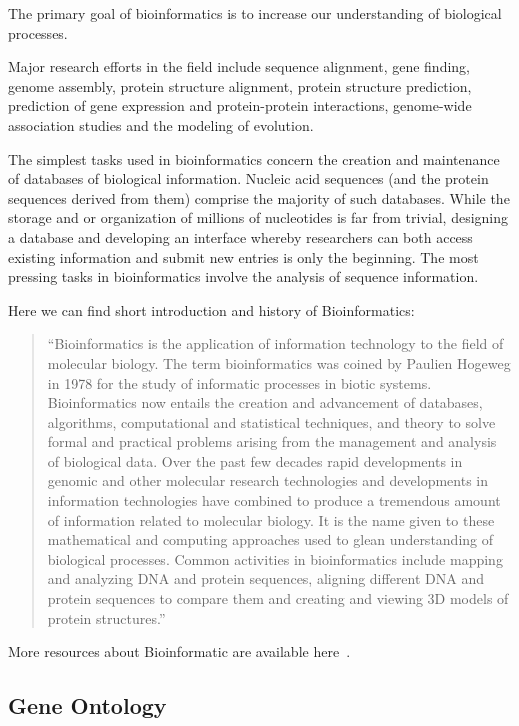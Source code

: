 The primary goal of bioinformatics is to increase our understanding of biological processes.


Major research efforts in the field include sequence alignment, gene finding, genome assembly, protein structure alignment, protein structure prediction, prediction of gene expression and protein-protein interactions, genome-wide association studies and the modeling of evolution.


The simplest tasks used in bioinformatics concern the creation and maintenance of databases of biological information.
Nucleic acid sequences (and the protein sequences derived from them) comprise the majority of such databases. While the storage and or organization of millions of nucleotides is far from trivial,
designing a database and developing an interface whereby researchers can both access existing information and submit new entries is only the beginning.
The most pressing tasks in bioinformatics involve the analysis of sequence information.~\cite{Biology}


Here we can find short introduction and history of Bioinformatics:

\begin{quotation}
``Bioinformatics is the application of information technology to the field of molecular biology.
The term bioinformatics was coined by Paulien Hogeweg in 1978 for the study of informatic processes in biotic systems.
Bioinformatics now entails the creation and advancement of databases, algorithms, computational and statistical techniques, and theory to solve formal and practical problems arising from the management and analysis of biological data.
Over the past few decades rapid developments in genomic and other molecular research technologies and developments in information technologies have combined to produce a tremendous amount of information related to molecular biology.
It is the name given to these mathematical and computing approaches used to glean understanding of biological processes.
Common activities in bioinformatics include mapping and analyzing DNA and protein sequences, aligning different DNA and protein sequences to compare them and creating and viewing 3D models of protein structures.''~\cite{Bioinformatic}
\end{quotation}

More resources about Bioinformatic are available here~\cite{Bioinformatic_resources}.

\subsection{Gene Ontology}
\label{sec:gene_ontology}

